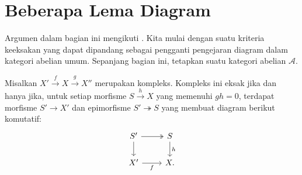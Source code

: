 
\section{Beberapa Lema Diagram}\label{sec:diagram-lemmas}
\hypertarget{o014.aljabr2.chapter2.diagram-lemmas}{ }

Argumen dalam bagian ini mengikuti \cite[Bab 8, 12]{KS06}. Kita mulai dengan
suatu kriteria keeksakan yang dapat dipandang sebagai pengganti pengejaran
diagram \cite[\S~6.8]{Li1} dalam kategori abelian umum. Sepanjang bagian ini,
tetapkan suatu kategori abelian $\mathcal{A}$.

\begin{lema}\label{prop:Abel-cat-exact-aux}
	Misalkan $X' \xrightarrow{f} X \xrightarrow{g} X''$ merupakan kompleks.
	Kompleks ini eksak jika dan hanya jika, untuk setiap morfisme
	$S \xrightarrow{h} X$ yang memenuhi $gh=0$, terdapat morfisme
	$S' \to X'$ dan epimorfisme $S' \twoheadrightarrow S$ yang membuat diagram
	berikut komutatif:
	\[\begin{tikzcd}
		S' \arrow[twoheadrightarrow, r] \arrow[d] & S \arrow[d, "h"] \\
		X' \arrow[r, "f"'] & X .
	\end{tikzcd}\]
\end{lema}

